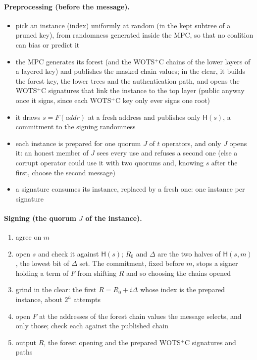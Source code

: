 \documentclass[11pt]{article}
\newcommand{\hash}{\mathsf{H}}
\begin{document}
\paragraph{Preprocessing (before the message).}
\begin{itemize}
  \item pick an instance (index) uniformly at random (in the kept subtree of a pruned key), from randomness generated
        inside the MPC, so that no coalition can bias or predict it
  \item the MPC generates its forest (and the WOTS$^+$C chains of the lower layers of a layered key) and publishes the
        masked chain values; in the clear, it builds the forest key, the lower trees and the authentication path, and
        opens the WOTS$^+$C signatures that link the instance to the top layer (public anyway once it signs, since
        each WOTS$^+$C key only ever signs one root)
  \item it draws $s=F(\mathit{addr})$ at a fresh address and publishes only $\hash(s)$, a commitment to the signing
        randomness
  \item each instance is prepared for one quorum $J$ of $t$ operators, and only $J$ opens it: an honest member of $J$
        sees every use and refuses a second one (else a corrupt operator could use it with two quorums and, knowing
        $s$ after the first, choose the second message)
  \item a signature consumes its instance, replaced by a fresh one: one instance per signature
\end{itemize}

\paragraph{Signing (the quorum $J$ of the instance).}
\begin{enumerate}
  \item agree on $m$
  \item open $s$ and check it against $\hash(s)$; $R_0$ and $\Delta$ are the two halves of $\hash(s, m)$, the lowest
        bit of $\Delta$ set. The commitment, fixed before $m$, stops a signer holding a term of $F$ from shifting $R$
        and so choosing the chains opened
  \item grind in the clear: the first $R = R_0 + i\Delta$ whose index is the prepared instance, about $2^h$ attempts
  \item open $F$ at the addresses of the forest chain values the message selects, and only those; check each against
        the published chain
  \item output $R$, the forest opening and the prepared WOTS$^+$C signatures and paths
\end{enumerate}
\end{document}
